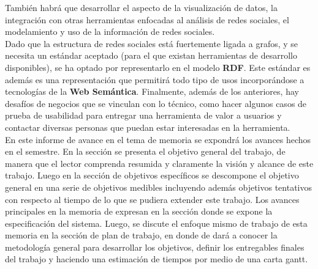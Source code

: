 \begin{intro}
  También habrá que desarrollar el aspecto de la visualización de datos, la integración con otras herramientas enfocadas al análisis de redes sociales, el modelamiento y uso de la información de redes sociales.\\

  Dado que la estructura de redes sociales está fuertemente ligada a grafos, y se necesita un estándar aceptado (para el que existan herramientas de desarrollo disponibles), se ha optado por representarlo en el modelo \textbf{RDF}. Este estándar es además es una representación que permitirá todo tipo de usos incorporándose a tecnologías de la \textbf{Web Semántica}. Finalmente, además de los anteriores, hay desafíos de negocios que se vinculan con lo técnico, como hacer algunos casos de prueba de usabilidad para entregar una herramienta de valor a usuarios y contactar diversas personas que puedan estar interesadas en la herramienta.\\

  En este informe de avance en el tema de memoria se expondrá los avances hechos en el semestre. En la sección  se presenta el objetivo general del trabajo, de manera que el lector comprenda resumida y claramente la visión y alcance de este trabajo. Luego en la sección de objetivos específicos se descompone el objetivo general en una serie de objetivos medibles incluyendo además objetivos tentativos con respecto al tiempo de lo que se pudiera extender este trabajo. Los avances principales en la memoria de expresan en la sección donde se expone la especificación del sistema. Luego, se discute el enfoque mismo de trabajo de esta memoria en la sección de plan de trabajo, en donde de dará a conocer la metodología general para desarrollar los objetivos, definir los entregables finales del trabajo y haciendo una estimación de tiempos por medio de una carta gantt.
  
\end{intro}